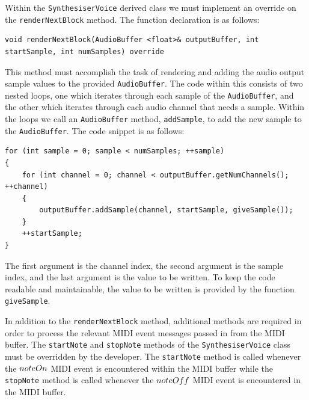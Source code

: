 \documentclass[a4paper,12pt]{report}
\begin{document}
Within the \texttt{Synthesiser\-Voice} derived class we must implement an override on the \texttt{render\-Next\-Block} method. The function declaration is as follows:

 \noindent\begin{minipage}{\linewidth} \begin{lstlisting}[caption={renderNextBlock() Override},label={code:rendernextblockoverride},captionpos=b]
void renderNextBlock(AudioBuffer <float>& outputBuffer, int startSample, int numSamples) override
\end{lstlisting} \end{minipage}

This method must accomplish the task of rendering and adding the audio output sample values to the provided \texttt{Audio\-Buffer}. The code within this consists of two nested loops, one which iterates through each sample of the \texttt{Audio\-Buffer}, and the other which iterates through each audio channel that needs a sample. Within the loops we call an \texttt{Audio\-Buffer} method, \texttt{add\-Sample}, to add the new sample to the \texttt{Audio\-Buffer}. The code snippet is as follows:

 \noindent\begin{minipage}{\linewidth} \begin{lstlisting}[caption={addSample()},label={code:addsample},captionpos=b]
for (int sample = 0; sample < numSamples; ++sample)
{
    for (int channel = 0; channel < outputBuffer.getNumChannels(); ++channel)
    {
        outputBuffer.addSample(channel, startSample, giveSample());
    }
    ++startSample;
}
\end{lstlisting} \end{minipage}

The first argument is the channel index, the second argument is the sample index, and the last argument is the value to be written. To keep the code readable and maintainable, the value to be written is provided by the function \texttt{give\-Sample}. 

In addition to the \texttt{render\-Next\-Block} method, additional methods are required in order to process the relevant MIDI event messages passed in from the MIDI buffer. The \texttt{start\-Note} and \texttt{stop\-Note} methods of the \texttt{Synthesiser\-Voice} class must be overridden by the developer. The \texttt{start\-Note} method is called whenever the $note\-On$ MIDI event is encountered within the MIDI buffer while the \texttt{stop\-Note} method is called whenever the $note\-Off$ MIDI event is encountered in the MIDI buffer.	
\end{document}
